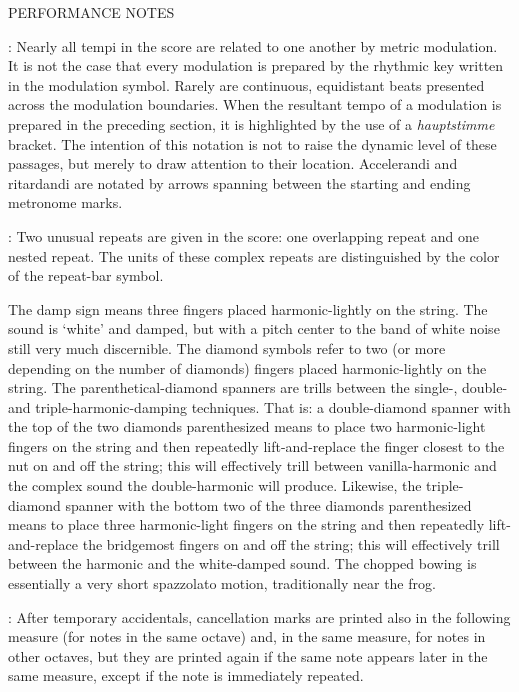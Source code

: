 \documentclass[11pt]{article}
\newcommand*\circled[1]{\tikz[baseline=(char.base)]{
            \node[shape=circle,draw,inner sep=1pt] (char) {#1};}}
\begin{document}
\begin{center}
\huge PERFORMANCE NOTES
\end{center}
\begingroup
\begin{center}

 : Nearly all tempi in the score are related to one another by metric modulation. It is not the case that every modulation is prepared by the rhythmic key written in the modulation symbol. Rarely are continuous, equidistant beats presented across the modulation boundaries. When the resultant tempo of a modulation is prepared in the preceding section, it is highlighted by the use of a \textit{hauptstimme} bracket. The intention of this notation is not to raise the dynamic level of these passages, but merely to draw attention to their location. Accelerandi and ritardandi are notated by arrows spanning between the starting and ending metronome marks.
\rightskip\leftskip
\phantom{text} \hfill \phantom{()}

 : Two unusual repeats are given in the score: one overlapping repeat and one nested repeat. The units of these complex repeats are distinguished by the color of the repeat-bar symbol.
\rightskip\leftskip
\phantom{text} \hfill \phantom{()}

\circled{1} The damp sign means three fingers placed harmonic-lightly on the string. The sound is `white' and damped, but with a pitch center to the band of white noise still very much discernible. \circled{2} The diamond symbols refer to two (or more depending on the number of diamonds) fingers placed harmonic-lightly on the string. \circled{3} The parenthetical-diamond spanners are trills between the single-, double- and triple-harmonic-damping techniques. That is: a double-diamond spanner with the top of the two diamonds parenthesized means to place two harmonic-light fingers on the string and then repeatedly lift-and-replace the finger closest to the nut on and off the string; this will effectively trill between vanilla-harmonic and the complex sound the double-harmonic will produce. Likewise, the triple-diamond spanner with the bottom two of the three diamonds parenthesized means to place three harmonic-light fingers on the string and then repeatedly lift-and-replace the bridgemost fingers on and off the string; this will effectively trill between the harmonic and the white-damped sound. \circled{4} The chopped bowing is essentially a very short spazzolato motion, traditionally near the frog.
\rightskip\leftskip
\phantom{text} \hfill \phantom{()}

 : After temporary accidentals, cancellation marks are printed also in the following measure (for notes in the same octave) and, in the same measure, for notes in other octaves, but they are printed again if the same note appears later in the same measure, except if the note is immediately repeated.
\rightskip\leftskip
\phantom{text} \hfill \phantom{()}
\end{center}
\endgroup
\end{document}
